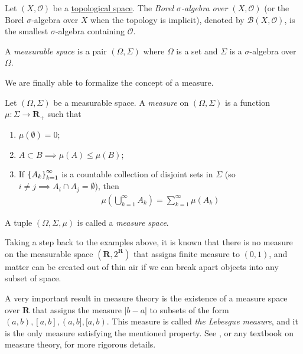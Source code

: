\begin{definition}\label{def:borel}
  Let $(X, \mathcal{O})$ be a \hyperref[def:topology]{topological
    space}. The \emph{Borel $\sigma$-algebra over $(X,\mathcal{O})$}
  (or the Borel $\sigma$-algebra over $X$ when the topology is
  implicit), denoted by $\mathscr{B}(X, \mathcal{O})$, is the
  smallest $\sigma$-algebra containing $\mathcal{O}$.
\end{definition}

\begin{definition}\label{def:measurable-space}
  A \emph{measurable space} is a pair $(\Omega, \Sigma)$ where
  $\Omega$ is a set and $\Sigma$ is a $\sigma$-algebra over $\Omega$.
\end{definition}

We are finally able to formalize the concept of a measure.

\begin{definition}[Measure]\label{def:measure}
  Let $(\Omega, \Sigma)$ be a measurable space. A \emph{measure} on
  $(\Omega,\Sigma)$ is a function $\mu:\Sigma\to\mathbf{R}_+$ such
  that

  \begin{enumerate}
  \item $\mu(\emptyset) = 0$;
  \item $A\subset B\implies \mu(A)\leq\mu(B)$;
  \item If $\indexedint{k}{\infty}{A}$ is a countable collection of disjoint
    sets in $\Sigma$ (so $i\neq j\implies A_i\cap A_j=\emptyset$),
    then
    \begin{align*}
      \mu\left(\bigcup_{k=1}^\infty A_k\right) = \sum_{k=1}^\infty \mu(A_k)
    \end{align*}
  \end{enumerate}

  A tuple $(\Omega, \Sigma, \mu)$ is called a \emph{measure space}.
\end{definition}

Taking a step back to the examples above, it is known that there is no
measure on the measurable space $(\mathbf{R}, 2^{\mathbf{R}})$ that
assigns finite measure to $(0,1)$, and matter can be created out of
thin air if we can break apart objects into any subset of space.

A very important result in measure theory is the existence of a measure
space over $\mathbf{R}$ that assigns the measure $|b - a|$ to subsets
of the form $(a, b), [a, b], (a, b], [a, b)$. This measure is called
\emph{the Lebesgue measure}\label{def:lebesgue}, and it is the only
measure satisfying the mentioned property. See
\citet{cohn2013measure}, or any textbook on measure theory, for more
rigorous details.

